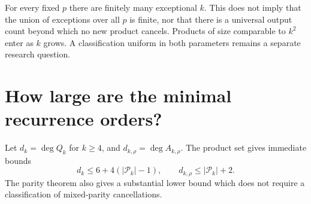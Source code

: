\documentclass[11pt,a4paper]{article}
\numberwithin{equation}{section}
\theoremstyle{definition}
\theoremstyle{remark}
\begin{document}
\begin{remark}
For every fixed $p$ there are finitely many exceptional $k$. This does
not imply that the union of exceptions over all $p$ is finite, nor that
there is a universal output count beyond which no new product cancels.
Products of size comparable to $k^2$ enter as $k$ grows. A classification
uniform in both parameters remains a separate research question.
\end{remark}

\section{How large are the minimal recurrence orders?}\label{sc:sec:orders}

Let $d_k=\deg Q_k$ for $k\ge4$, and $d_{k,\rho}=\deg A_{k,\rho}$.
The product set gives immediate bounds
\begin{equation}\label{sc:eq:degreeupper}
 d_k\le6+4(|\mathcal P_k|-1),\qquad d_{k,\rho}\le |\mathcal P_k|+2.
\end{equation}
The parity theorem also gives a substantial lower bound which does not
require a classification of mixed-parity cancellations.
\end{document}
